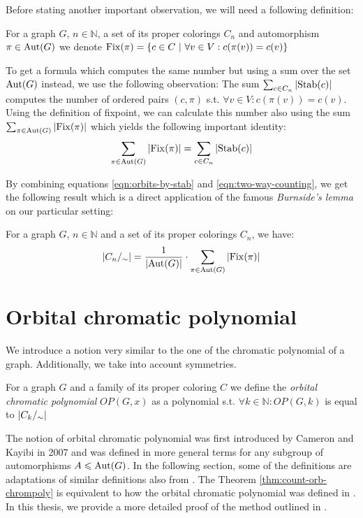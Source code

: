 Before stating another important observation, we will need a following definition:

\begin{defn}[fixpoint]
    For a graph $G$, $n \in \mathbb{N}$, a set of its proper colorings $C_n$ and automorphism $\pi \in \operatorname{Aut}(G)$ we denote $\operatorname{Fix}(\pi)= \{ c \in C \ | \ \forall v \in V : c(\pi(v)) = c(v) \}$
\end{defn}

To get a formula which computes the same number but using a sum over the set $\operatorname{Aut}(G)$ instead, we use the following observation: The sum $\sum_{c \in C_n} \left|{\operatorname{Stab}(c)}\right|$ computes the number of ordered pairs $(c,\pi)$ s.t. $\forall v \in V : c(\pi(v)) = c(v)$. Using the definition of fixpoint, we can calculate this number also using the sum $\sum_{\pi \in \operatorname{Aut}(G)} \left|{\operatorname{Fix}(\pi)}\right|$ which yields the following important identity:
\begin{equation}\label{eqn:two-way-counting}
    \sum_{\pi \in \operatorname{Aut}(G)} \left|{\operatorname{Fix}(\pi)}\right| = \sum_{c \in C_n}\left|{\operatorname{Stab}(c)}\right|    
\end{equation}

By combining equations \ref{eqn:orbits-by-stab} and \ref{eqn:two-way-counting}, we get the following result which is a direct application of the famous \textit{Burnside's lemma} on our particular setting:

\begin{thm} \label{thm:burnside}
    For a graph $G$, $n \in \mathbb{N}$ and a set of its proper colorings $C_n$, we have:
    $$\left|{C_n/_\sim}\right| = \frac{1}{\left|{\operatorname{Aut}(G)}\right|}\cdot \sum_{\pi \in \operatorname{Aut}(G)}\left|{\operatorname{Fix}(\pi)}\right|$$
\end{thm}

\section{Orbital chromatic polynomial}

We introduce a notion very similar to the one of the chromatic polynomial of a graph. Additionally, we take into account symmetries.

\begin{defn}
    For a graph $G$ and a family of its proper coloring $C$ we define the \emph{orbital chromatic polynomial} $OP(G,x)$ as a polynomial s.t. $\forall k \in \mathbb{N} : OP(G,k)$ is equal to $\left|{C_k/_\sim}\right|$
\end{defn}

The notion of orbital chromatic polynomial was first introduced by Cameron and Kayibi \cite{caka2007} in 2007 and was defined in more general terms for any subgroup of automorphisms $A \leqslant  \operatorname{Aut}(G)$. In the following section, some of the definitions are adaptations of similar definitions also from \cite{caka2007}. The Theorem \ref{thm:count-orb-chrompoly} is equivalent to how the orbital chromatic polynomial was defined in \cite{caka2007}. In this thesis, we provide a more detailed proof of the method outlined in \cite{caka2007}. 

